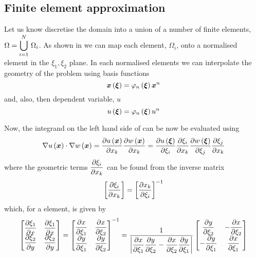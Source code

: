 \subsection{Finite element approximation}
\label{subsec:FEMTwoDLaplaceFiniteElementApproximation}

Let us know discretise the domain into a union of a number of finite
elements, $\Omega =   \displaystyle\bigcup _{i=1}^{N}\,\Omega_{i} $. As shown in
 we can map each element, $\Omega_{i}$, onto
a normalised element in the $\xi_{1},\xi_{2}$ plane. In each
normalised elements we can interpolate the geometry of the problem
using basis functions \ie
\begin{equation}
    \boldsymbol{x} \left(  \boldsymbol{\xi}  \right) =   \varphi_{n} \left(  \boldsymbol{\xi}  \right)   { \boldsymbol{x} }^{n} 
\end{equation}
and, also, then dependent variable, $u$ \ie
\begin{equation}
   u\left(  \boldsymbol{\xi}  \right) =   \varphi_{n} \left(  \boldsymbol{\xi}  \right)   {u}^{n} 
\end{equation}


Now, the integrand on the left hand side of  can be now be evaluated using
\begin{equation}
  \dotprod{\gradient{}{\fnof{u}{\vectr{x}}}}{\gradient{}{\fnof{w}{\vectr{x}}}}=
  \delby{\fnof{u}{\vectr{x}}}{x_{k}}\delby{\fnof{w}{\vectr{x}}}{x_{k}}=
  \delby{\fnof{u}{\vectr{\xi}}}{\xi_{i}}\delby{\xi_{i}}{x_{k}}\delby{\fnof{w}{\vectr{\xi}}}{\xi_{j}}\delby{\xi_{j}}{x_{k}}
\end{equation}
where the geometric terms $ \dfrac{\partial \xi_{i}}{\partial x_{k}} $ can be found from
the inverse matrix
\begin{equation}
  \left[  \dfrac{\partial \xi_{i}}{\partial x_{k}}  \right]={\left[  \dfrac{\partial x_{k}}{\partial \xi_{i}}  \right]}^{-1}
\end{equation}
which, for a \twodal element, is given by
\begin{equation}
  \begin{bmatrix}
     \dfrac{\partial \xi_{1}}{\partial x}  &  \dfrac{\partial \xi_{1}}{\partial x}  \\
     \dfrac{\partial \xi_{2}}{\partial y}  &  \dfrac{\partial \xi_{2}}{\partial y} 
  \end{bmatrix} = { \begin{bmatrix}
     \dfrac{\partial x}{\partial \xi_{1}}  &  \dfrac{\partial x}{\partial \xi_{2}}  \\
     \dfrac{\partial y}{\partial \xi_{1}}  &  \dfrac{\partial y}{\partial \xi_{2}} 
  \end{bmatrix}}^{-1}=\dfrac{1}{\left|  \dfrac{\partial x}{\partial \xi_{1}}  \dfrac{\partial y}{\partial \xi_{2}} - \dfrac{\partial x}{\partial \xi_{2}}  \dfrac{\partial y}{\partial \xi_{1}}  \right|}
  \begin{bmatrix}
     \dfrac{\partial y}{\partial \xi_{2}}  & - \dfrac{\partial x}{\partial \xi_{2}}  \\
    - \dfrac{\partial y}{\partial \xi_{1}}  &  \dfrac{\partial x}{\partial \xi_{1}}     
  \end{bmatrix}
\end{equation}

